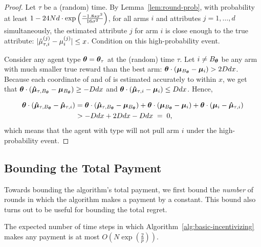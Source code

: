 \begin{proof}
Let $\tau$ be a (random) time.
By Lemma~\ref{lem:round-prob},
with probability at least
$1 - 24 N d \cdot \exp \left( \frac{-1.8 s x^2}{16\sigma^2} \right)$,
for all arms $i$ and attributes $j = 1, \ldots, d$ simultaneously,
the estimated attribute $j$ for arm $i$ is close enough to the true attribute: 
$|\hat{\mu}_{\tau,i}^{(j)} - \mu_{i}^{(j)}| \leq x$.
Condition on this high-probability event.

Consider any agent type $\bm{\theta} = \bm{\theta}_{\tau}$ at the (random) time
$\tau$.
Let $i \neq B_{\bm{\theta}}$ be any arm
with much smaller true reward than the best arm:
$\bm{\theta} \cdot (\bm{\mu}_{B_{\bm{\theta}}} - \bm{\mu}_{i}) > 2D d x$.
Because each coordinate of \ArmEV{\tau}{\Best{\AgV}} and of
 is estimated accurately to within $x$, 
we get that 
$\bm{\theta} \cdot (\bm{\hat{\mu}}_{\tau,B_{\bm{\theta}}} - \bm{\mu}_{B_{\bm{\theta}}})
\geq - D d x$
and
$\bm{\theta} \cdot (\bm{\hat{\mu}}_{\tau,i} - \bm{\mu}_{i}) \leq D d x$.
Hence, 

\begin{align}
\bm{\theta} \cdot (\bm{\hat{\mu}}_{\tau,B_{\bm{\theta}}} - \bm{\hat{\mu}}_{\tau,i})
& =
\bm{\theta} \cdot (\bm{\hat{\mu}}_{\tau,B_{\bm{\theta}}} - \bm{\mu}_{B_{\bm{\theta}}})
+ \bm{\theta} \cdot (\bm{\mu}_{B_{\bm{\theta}}} - \bm{\mu}_{i})
+ \bm{\theta} \cdot (\bm{\mu}_{i} - \bm{\hat{\mu}}_{\tau,i}) \nonumber\\
& > -D d x + 2 D d x - D d x
\; = \; 0, \label{equ:choice}
\end{align}
which means that the agent with type \AgV will not pull arm $i$
under the high-probability event.
\end{proof}

\subsection{Bounding the Total Payment}

Towards bounding the algorithm's total payment, we first bound the
\emph{number} of rounds in which the algorithm makes a payment by a
constant.
This bound also turns out to be useful for bounding the total regret.

\begin{lemma} \label{lem:numP}
The expected number of time steps in which
Algorithm~\ref{alg:basic-incentivizing}
makes any payment is at most $O\left( N\exp\left(\frac{2}{p}\right) \right)$.
\end{lemma}

